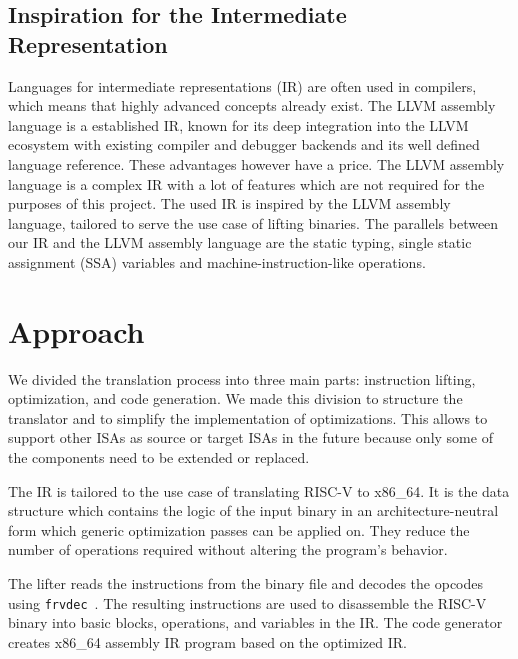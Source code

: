 \documentclass[course=eragp]{aspdoc}
\begin{document}
\subsection{Inspiration for the Intermediate Representation}

Languages for intermediate representations (IR) are often used in compilers, which means that highly
advanced concepts already exist. The LLVM assembly language is a established IR, known for its deep
integration into the LLVM ecosystem with existing compiler and debugger backends and its well
defined language reference. These advantages however have a price. The LLVM assembly language is a
complex IR with a lot of features which are not required for the purposes of this project. The used IR
is inspired by the LLVM assembly language, tailored to serve the use case of lifting binaries. The
parallels between our IR and the LLVM assembly language are the static
typing, single static assignment (SSA) variables and machine-instruction-like operations.

\section{Approach}\label{sec:approach}

We divided the translation process into three main parts: instruction lifting, optimization, and code
generation. We made this division to structure the translator and to simplify the implementation of
optimizations. This allows to support other ISAs as source or target ISAs in the future
because only some of the components need to be extended or replaced.

\par

The IR is tailored to the use case of translating RISC-V to x86\_64. It is the data structure which
contains the logic of the input binary in an architecture-neutral form which generic optimization
passes can be applied on. They reduce the number of operations required without altering the
program's behavior.

\par

The lifter reads the instructions from the binary file and decodes the opcodes using
\texttt{frvdec}~\cite{frvdec}. The resulting instructions are used to disassemble the RISC-V binary
into basic blocks, operations, and variables in the IR. The code generator creates x86\_64
assembly IR program based on the optimized IR.

\par
\end{document}
